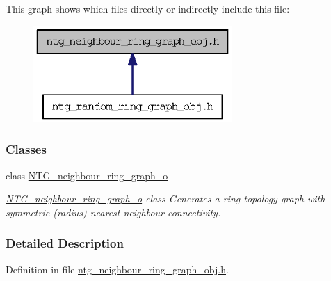 This graph shows which files directly or indirectly include this file:
\nopagebreak
\begin{figure}[H]
\begin{center}
\leavevmode
\includegraphics[width=214pt]{ntg__neighbour__ring__graph__obj_8h__dep__incl}
\end{center}
\end{figure}
\subsubsection*{Classes}
\begin{DoxyCompactItemize}
\item 
class \hyperlink{class_n_t_g__neighbour__ring__graph__o}{NTG\_\-neighbour\_\-ring\_\-graph\_\-o}
\begin{DoxyCompactList}\small\item\em \hyperlink{class_n_t_g__neighbour__ring__graph__o}{NTG\_\-neighbour\_\-ring\_\-graph\_\-o} class Generates a ring topology graph with symmetric (radius)-\/nearest neighbour connectivity. \item\end{DoxyCompactList}\end{DoxyCompactItemize}


\subsubsection{Detailed Description}


Definition in file \hyperlink{ntg__neighbour__ring__graph__obj_8h_source}{ntg\_\-neighbour\_\-ring\_\-graph\_\-obj.h}.

